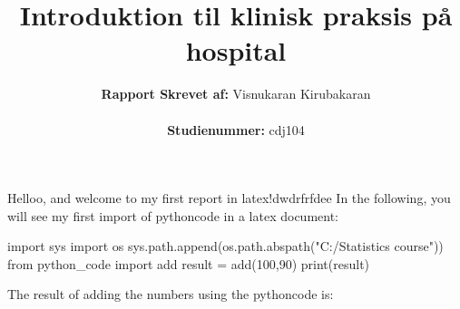 \documentclass{article}
\title{Introduktion til klinisk praksis på hospital}
\author{\textbf{Rapport
Skrevet af:} Visnukaran Kirubakaran
\noindent
\\
\\
\textbf{Studienummer:} cdj104}
\begin{document}
\maketitle
\noindent
Helloo, and welcome to my first report in latex!dwdrfrfdee
\noindent
In the following, you will see my first import of pythoncode in a latex document:
\noindent
\begin{pycode}
import sys
import os
sys.path.append(os.path.abspath("C:/Statistics course"))
from python_code import add
result = add(100,90)
print(result)
\end{pycode}
\noindent
The result of adding the numbers using the pythoncode is: 
\end{document}
